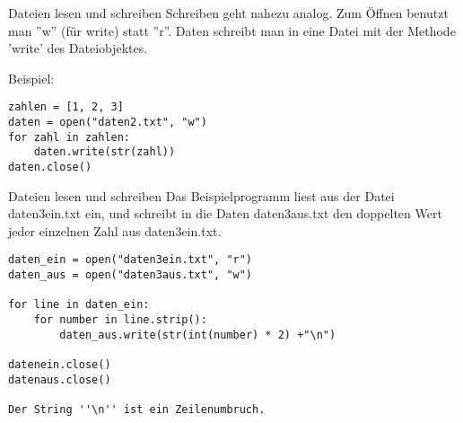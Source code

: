 \begin{frame}[fragile]{Dateien lesen und schreiben}
Schreiben geht nahezu analog. Zum Öffnen benutzt man ''w'' (für write) statt ''r''. Daten schreibt man in eine Datei mit der Methode 'write' des Dateiobjektes.

Beispiel:
\begin{lstlisting}
zahlen = [1, 2, 3]
daten = open("daten2.txt", "w")
for zahl in zahlen:
	daten.write(str(zahl))
daten.close()
\end{lstlisting}
\end{frame}


\begin{frame}[fragile]{Dateien lesen und schreiben}
Das Beispielprogramm liest aus der Datei daten3ein.txt ein, und schreibt in die Daten daten3aus.txt den doppelten Wert jeder einzelnen Zahl aus daten3ein.txt.


\begin{lstlisting}
daten_ein = open("daten3ein.txt", "r")
daten_aus = open("daten3aus.txt", "w")

for line in daten_ein:
	for number in line.strip():
		daten_aus.write(str(int(number) * 2) +"\n")

datenein.close()
datenaus.close()

Der String ''\n'' ist ein Zeilenumbruch.
\end{lstlisting}
\end{frame}